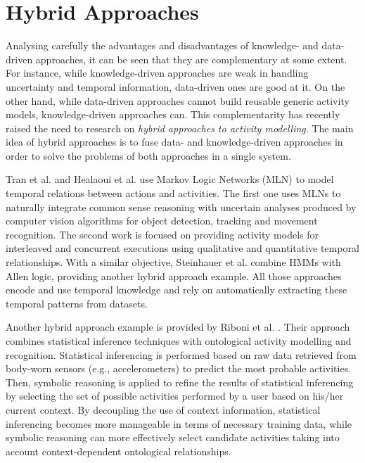 \section{Hybrid Approaches}
\label{sec:soa:hybrid}


Analysing carefully the advantages and disadvantages of knowledge- and data-driven approaches, it can be seen that they are complementary at some extent. For instance, while knowledge-driven approaches are weak in handling uncertainty and temporal information, data-driven ones are good at it. On the other hand, while data-driven approaches cannot build reusable generic activity models, knowledge-driven approaches can. This complementarity has recently raised the need to research on \textit{hybrid approaches to activity modelling}. The main idea of hybrid approaches is to fuse data- and knowledge-driven approaches in order to solve the problems of both approaches in a single system.

Tran et al. \cite{Tran2008} and Healaoui et al. \cite{Helaoui2011a} use Markov Logic Networks (MLN) to model temporal relations between actions and activities. The first one uses MLNs to naturally integrate common sense reasoning with uncertain analyses produced by computer vision algorithms for object detection, tracking and movement recognition. The second work is focused on providing activity models for interleaved and concurrent executions using qualitative and quantitative temporal relationships. With a similar objective, Steinhauer et al. \cite{Steinhauer2010} combine HMMs with Allen logic, providing another hybrid approach example. All those approaches encode and use temporal knowledge and rely on automatically extracting these temporal patterns from datasets.

Another hybrid approach example is provided by Riboni et al. \cite{Riboni2011a}. Their approach combines statistical inference techniques with ontological activity modelling and recognition. Statistical inferencing is performed based on raw data retrieved from body-worn sensors (e.g., accelerometers) to predict the most probable activities. Then, symbolic reasoning is applied to refine the results of statistical inferencing by selecting the set of possible activities performed by a user based on his/her current context. By decoupling the use of context information, statistical inferencing becomes more manageable in terms of necessary training data, while symbolic reasoning can more effectively select candidate activities taking into account context-dependent ontological relationships.

